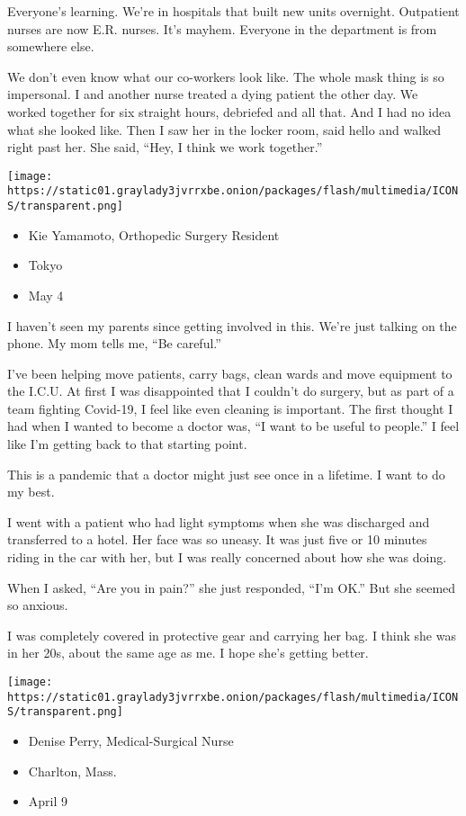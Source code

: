 Everyone's learning. We're in hospitals that built new units overnight.
Outpatient nurses are now E.R. nurses. It's mayhem. Everyone in the
department is from somewhere else.

We don't even know what our co-workers look like. The whole mask thing
is so impersonal. I and another nurse treated a dying patient the other
day. We worked together for six straight hours, debriefed and all that.
And I had no idea what she looked like. Then I saw her in the locker
room, said hello and walked right past her. She said, ``Hey, I think we
work together.''

\texttt{[image: https://static01.graylady3jvrrxbe.onion/packages/flash/multimedia/ICONS/transparent.png]}

\begin{itemize}
\tightlist
\item
  Kie Yamamoto, Orthopedic Surgery Resident
\item
  Tokyo
\item
  May 4
\end{itemize}

I haven't seen my parents since getting involved in this. We're just
talking on the phone. My mom tells me, ``Be careful.''

I've been helping move patients, carry bags, clean wards and move
equipment to the I.C.U. At first I was disappointed that I couldn't do
surgery, but as part of a team fighting Covid-19, I feel like even
cleaning is important. The first thought I had when I wanted to become a
doctor was, ``I want to be useful to people.'' I feel like I'm getting
back to that starting point.

This is a pandemic that a doctor might just see once in a lifetime. I
want to do my best.

I went with a patient who had light symptoms when she was discharged and
transferred to a hotel. Her face was so uneasy. It was just five or 10
minutes riding in the car with her, but I was really concerned about how
she was doing.

When I asked, ``Are you in pain?'' she just responded, ``I'm OK.'' But
she seemed so anxious.

I was completely covered in protective gear and carrying her bag. I
think she was in her 20s, about the same age as me. I hope she's getting
better.

\texttt{[image: https://static01.graylady3jvrrxbe.onion/packages/flash/multimedia/ICONS/transparent.png]}

\begin{itemize}
\tightlist
\item
  Denise Perry, Medical-Surgical Nurse
\item
  Charlton, Mass.
\item
  April 9
\end{itemize}

